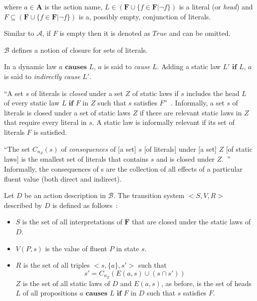 \noindent
where $a \in \boldsymbol{A}$ is the action name, $L \in(\boldsymbol{F} \cup\{f \in \boldsymbol{F}| \neg f\})$ is a literal (or \textit{head}) and $F \subseteq(\boldsymbol{F} \cup\{f \in \boldsymbol{F}| \neg f\})$ is a, possibly empty, conjunction of literals.

Similar to $\mathcal{A}$, if $F$ is empty then it is denoted as $True$ and can be omitted.

$\mathcal{B}$ defines a notion of closure for sets of literals.

\begin{definition}
    \label{def:causation}
    In a dynamic law $a \textbf{ causes } L$, $a$ is said to \textit{cause} $L$.
    Adding a static law $L' \textbf{ if } L$, $a$ is said to \textit{indirectly cause} $L'$.
\end{definition}

\begin{definition}
    ``A set $s$ of literals is \textit{closed} under a set $Z$ of static laws if $s$ includes the head $L$ of every static law $L \textbf{ if } F$ in $Z$ such that $s$ satisfies $F$''~\citep{gelfond_action_1998}.
    Informally, a set $s$ of literals is closed under a set of static laws $Z$ if there are relevant static laws in $Z$ that require every literal in $s$.
    A static law is informally relevant if its set of literals $F$ is satisfied.
\end{definition}

\begin{definition}
    ``The set $C_{n_Z}\left(s\right)$ of \textit{consequences} of [a set] $s$ [of literals] under [a set] $Z$ [of static laws] is the smallest set of literals that contains $s$ and is closed under $Z$.~\citep{gelfond_action_1998}''
    Informally, the consequences of s are the collection of all effects of a particular fluent value (both direct and indirect).
\end{definition}

\begin{definition}
    Let $D$ be an action description in $\mathcal{B}$.
    The transition system $< S, V, R >$ described by $D$ is defined as follows~\citep{gelfond_action_1998}:

    \begin{itemize}
        \item $S$ is the set of all interpretations of $\boldsymbol{F}$ that are closed under the static laws of $D$.
        \item $ V(P, s) $ is the value of fluent $P$ in state $s$.
        \item $R$ is the set of all triples $<s, \{a\}, s'>$ such that
            \[
            s'=C_{n_Z}\left(E\left(a,s\right)\cup\left(s \cap s'\right)\right)
            \]
            $ Z $ is the set of all static laws of $D$ and $E(a, s)$, as before, is the set of heads $L$ of all propositions $a \textbf{ causes } L \textbf{ if } F$ in $D$ such that $s$ satisfies $F$.
    \end{itemize}
\end{definition}

